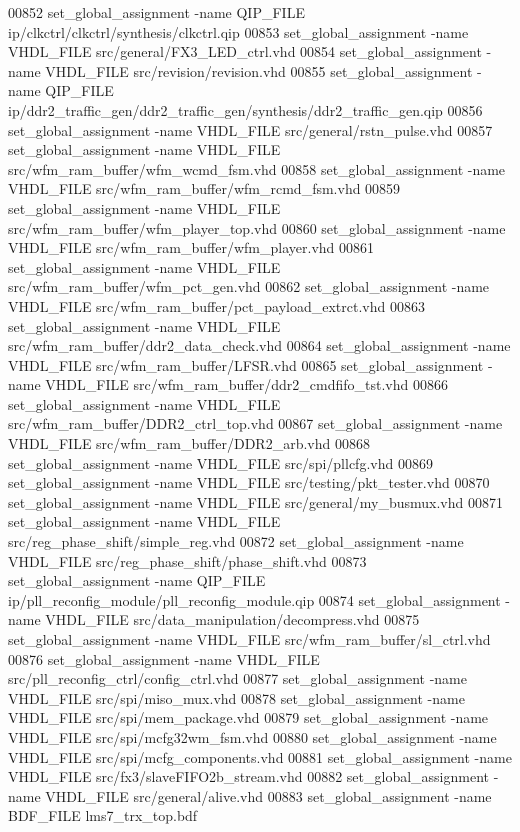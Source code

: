 \begin{DoxyCode}
00852 set\_global\_assignment -name QIP\_FILE ip/clkctrl/clkctrl/synthesis/clkctrl.qip
00853 set\_global\_assignment -name VHDL\_FILE src/general/FX3\_LED\_ctrl.vhd
00854 set\_global\_assignment -name VHDL\_FILE src/revision/revision.vhd
00855 set\_global\_assignment -name QIP\_FILE ip/ddr2\_traffic\_gen/ddr2\_traffic\_gen/synthesis/ddr2\_traffic\_gen.qip
00856 set\_global\_assignment -name VHDL\_FILE src/general/rstn\_pulse.vhd
00857 set\_global\_assignment -name VHDL\_FILE src/wfm\_ram\_buffer/wfm\_wcmd\_fsm.vhd
00858 set\_global\_assignment -name VHDL\_FILE src/wfm\_ram\_buffer/wfm\_rcmd\_fsm.vhd
00859 set\_global\_assignment -name VHDL\_FILE src/wfm\_ram\_buffer/wfm\_player\_top.vhd
00860 set\_global\_assignment -name VHDL\_FILE src/wfm\_ram\_buffer/wfm\_player.vhd
00861 set\_global\_assignment -name VHDL\_FILE src/wfm\_ram\_buffer/wfm\_pct\_gen.vhd
00862 set\_global\_assignment -name VHDL\_FILE src/wfm\_ram\_buffer/pct\_payload\_extrct.vhd
00863 set\_global\_assignment -name VHDL\_FILE src/wfm\_ram\_buffer/ddr2\_data\_check.vhd
00864 set\_global\_assignment -name VHDL\_FILE src/wfm\_ram\_buffer/LFSR.vhd
00865 set\_global\_assignment -name VHDL\_FILE src/wfm\_ram\_buffer/ddr2\_cmdfifo\_tst.vhd
00866 set\_global\_assignment -name VHDL\_FILE src/wfm\_ram\_buffer/DDR2\_ctrl\_top.vhd
00867 set\_global\_assignment -name VHDL\_FILE src/wfm\_ram\_buffer/DDR2\_arb.vhd
00868 set\_global\_assignment -name VHDL\_FILE src/spi/pllcfg.vhd
00869 set\_global\_assignment -name VHDL\_FILE src/testing/pkt\_tester.vhd
00870 set\_global\_assignment -name VHDL\_FILE src/general/my\_busmux.vhd
00871 set\_global\_assignment -name VHDL\_FILE src/reg\_phase\_shift/simple\_reg.vhd
00872 set\_global\_assignment -name VHDL\_FILE src/reg\_phase\_shift/phase\_shift.vhd
00873 set\_global\_assignment -name QIP\_FILE ip/pll\_reconfig\_module/pll\_reconfig\_module.qip
00874 set\_global\_assignment -name VHDL\_FILE src/data\_manipulation/decompress.vhd
00875 set\_global\_assignment -name VHDL\_FILE src/wfm\_ram\_buffer/sl\_ctrl.vhd
00876 set\_global\_assignment -name VHDL\_FILE src/pll\_reconfig\_ctrl/config\_ctrl.vhd
00877 set\_global\_assignment -name VHDL\_FILE src/spi/miso\_mux.vhd
00878 set\_global\_assignment -name VHDL\_FILE src/spi/mem\_package.vhd
00879 set\_global\_assignment -name VHDL\_FILE src/spi/mcfg32wm\_fsm.vhd
00880 set\_global\_assignment -name VHDL\_FILE src/spi/mcfg\_components.vhd
00881 set\_global\_assignment -name VHDL\_FILE src/fx3/slaveFIFO2b\_stream.vhd
00882 set\_global\_assignment -name VHDL\_FILE src/general/alive.vhd
00883 set\_global\_assignment -name BDF\_FILE lms7\_trx\_top.bdf

\end{DoxyCode}
